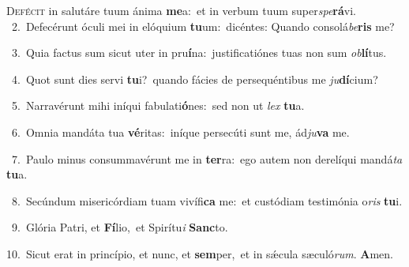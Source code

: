 \lettrine{\initial\textcolor{\initialcolor}{D}}{efécit} in salutáre tuum ánima \textbf{me}\-a:~\star et in verbum tuum super\-\textit{spe}\-\textbf{rá}vi.\\
{\numbfont\textcolor{\numbcolor}{~2.}}~Defecérunt óculi mei in elóquium \textbf{tu}\-um:~\star dicéntes: Quando consolá\-\textit{be}\-\textbf{ris} me?\par
{\numbfont\textcolor{\numbcolor}{~3.}}~Quia factus sum sicut uter in pru\-\textbf{í}\-na:~\star justificatiónes tuas non sum \textit{ob}\-\textbf{lí}tus.\par
{\numbfont\textcolor{\numbcolor}{~4.}}~Quot sunt dies servi \textbf{tu}\-i?~\star quando fácies de persequéntibus me \textit{ju}\-\textbf{dí}cium?\par
{\numbfont\textcolor{\numbcolor}{~5.}}~Narravérunt mihi iníqui fabulati\-\textbf{ó}\-nes:~\star sed non ut \textit{lex} \textbf{tu}\-a.\par
{\numbfont\textcolor{\numbcolor}{~6.}}~Omnia mandáta tua \textbf{vé}\-ritas:~\star iníque persecúti sunt me, ád\-\textit{ju}\-\textbf{va} me.\par
{\numbfont\textcolor{\numbcolor}{~7.}}~Paulo minus consummavérunt me in \textbf{ter}\-ra:~\star ego autem non derelíqui mandá\textit{ta} \textbf{tu}\-a.\par
{\numbfont\textcolor{\numbcolor}{~8.}}~Secúndum misericórdiam tuam vivífi\textbf{ca} me:~\star et custódiam testimónia o\textit{ris} \textbf{tu}\-i.\par
{\numbfont\textcolor{\numbcolor}{~9.}}~Glória Patri, et \textbf{Fí}\-lio,~\star et Spirítu\textit{i} \textbf{Sanc}\-to.\par
{\numbfont\textcolor{\numbcolor}{10.}}~Sicut erat in princípio, et nunc, et \textbf{sem}\-per,~\star et in sǽcula sæculó\-\textit{rum}\-. \textbf{A}\-men.\par
